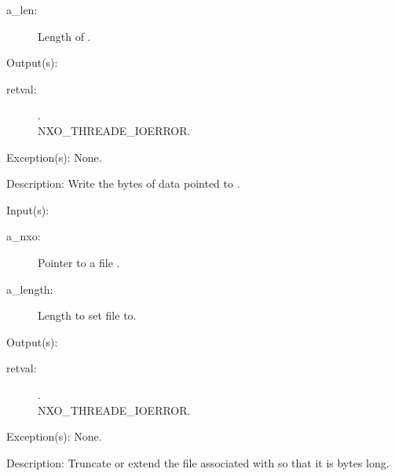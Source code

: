 \begin{capi}
\begin{capilist}
\begin{description}
		\item[a\_len: ]
			Length of .
		\end{description}
	\item[Output(s): ]
		\begin{description}\item[]
		\item[retval: ]
			\begin{description}\item[]
			\item[.]
			\item[
				{NXO_THREADE_IOERROR}.]
			\end{description}
		\end{description}
	\item[Exception(s): ] None.
	\item[Description: ]
		Write the  bytes of data pointed to .
	\end{capilist}
\label{nxo_file_truncate}
	\begin{capilist}
	\item[Input(s): ]
		\begin{description}\item[]
		\item[a\_nxo: ]
			Pointer to a file .
		\item[a\_length: ]
			Length to set file to.
		\end{description}
	\item[Output(s): ]
		\begin{description}\item[]
		\item[retval: ]
			\begin{description}\item[]
			\item[.]
			\item[
				{NXO_THREADE_IOERROR}.]
			\end{description}
		\end{description}
	\item[Exception(s): ] None.
	\item[Description: ]
		Truncate or extend the file associated with  so
		that it is  bytes long.

\end{capilist}
\end{capi}
